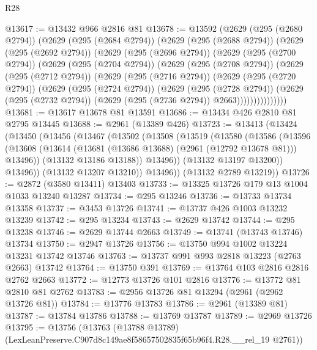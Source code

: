 \begin{lexlean}{R28}
\begin{coremodule}
@13617 := @13432 @966 @2816 @81
@13678 := @13592
    (@2629
      (@295 (@2680 @2794))
      (@2629
        (@295 (@2684 @2794))
        (@2629
          (@295 (@2688 @2794))
          (@2629
            (@295 (@2692 @2794))
            (@2629
              (@295 (@2696 @2794))
              (@2629
                (@295 (@2700 @2794))
                (@2629
                  (@295 (@2704 @2794))
                  (@2629
                    (@295 (@2708 @2794))
                    (@2629
                      (@295 (@2712 @2794))
                      (@2629
                        (@295 (@2716 @2794))
                        (@2629
                          (@295 (@2720 @2794))
                          (@2629
                            (@295 (@2724 @2794))
                            (@2629
                              (@295 (@2728 @2794))
                              (@2629
                                (@295 (@2732 @2794))
                                (@2629 (@295 (@2736 @2794)) @2663)))))))))))))))
@13681 := @13617 @13678 @81 @13591
@13686 := @13434 @426 @2810 @81 @2795 @13445
@13688 := @2961 (@13389 @426)
@13723 := @13413
    (@13424
      (@13450
        (@13456
          (@13467
            (@13502
              (@13508
                (@13519
                  (@13580
                    (@13586
                      (@13596
                        (@13608
                          (@13614 (@13681 (@13686 @13688) (@2961 (@12792 @13678 @81))) @13496))
                        (@13132 @13186 @13188))
                      @13496))
                  (@13132 @13197 @13200))
                @13496))
            (@13132 @13207 @13210))
          @13496))
      (@13132 @2789 @13219))
@13726 := @2872 (@3580 @13411) @13403
@13733 := @13325 @13726 @179 @13 @1004 @1033 @13240 @13287
@13734 := @295 @13246
@13736 := @13733 @13734 @13358
@13737 := @3453 @13726
@13741 := @13737 @426 @1003 @13232 @13239
@13742 := @295 @13234
@13743 := @2629 @13742
@13744 := @295 @13238
@13746 := @2629 @13744 @2663
@13749 := @13741 (@13743 @13746) @13734
@13750 := @2947 @13726
@13756 := @13750 @994 @1002 @13224 @13231 @13742 @13746
@13763 := @13737 @991 @993 @2818 @13223 (@2763 @2663) @13742
@13764 := @13750 @391
@13769 := @13764 @103 @2816 @2816 @2762 @2663
@13772 := @12773 @13726 @101 @2816
@13776 := @13772 @81 @2810 @81 @2762
@13783 := @2956 @13726 @81 @13294 (@2961 (@2962 @13726 @81))
@13784 := @13776 @13783
@13786 := @2961 (@13389 @81)
@13787 := @13784 @13786
@13788 := @13769 @13787
@13789 := @2969 @13726
@13795 := @13756
    (@13763 (@13788 @13789) (LexLeanPreserve.C907d8c149ae8f58657502835f65b96f4.R28.__rel_19 @2761))

\end{coremodule}
\end{lexlean}
